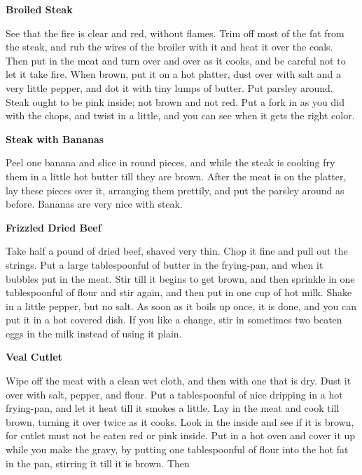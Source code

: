 \documentclass[11pt]{book}
\newcommand{\indpar}{\par\noindent\hspace*{\parindent}}
\newcommand{\instruction}{\indpar}
\newenvironment{RecipeTitle}{\medskip\begin{center}\large\bf }{\end{center}\smallskip}
\begin{document}
\begin{RecipeTitle}
Broiled Steak\label{broiled_steak}
\end{RecipeTitle}
\instruction
  See that the fire is clear and red, without flames.  Trim off
most of the fat from the steak, and rub the wires of the broiler
with it and heat it over the coals.  Then put in the meat and
turn over and over as it cooks, and be careful not to let it take
fire.  When brown, put it on a hot platter, dust over with salt
and a very little pepper, and dot it with tiny lumps of butter.
Put parsley around.  Steak ought to be pink inside; not brown
and not red.  Put a fork in as you did with the chops, and twist
in a little, and you can see when it gets the right color.
\begin{RecipeTitle}
Steak with Bananas\label{steak_with_bananas}
\end{RecipeTitle}
\instruction
  Peel one banana and slice in round pieces, and while the steak
is cooking fry them in a little hot butter till they are brown.
After the meat is on the platter, lay these pieces over it,
arranging them prettily, and put the parsley around as before.
Bananas are very nice with steak.\pagebreak[4]
\begin{RecipeTitle}
Frizzled Dried Beef\label{frizzled_dried_beef}
\end{RecipeTitle}
\instruction
  Take half a pound of dried beef, shaved very thin.  Chop it fine
and pull out the strings.  Put a large tablespoonful of butter in
the frying-pan, and when it bubbles put in the meat.  Stir till it
begins to get brown, and then sprinkle in one tablespoonful of flour
and stir again, and then put in one cup of hot milk.  Shake in a
little pepper, but no salt.  As soon as it boils up once, it is
done, and you can put it in a hot covered dish.  If you like a
change, stir in sometimes two beaten eggs in the milk instead of
using it plain.
\begin{RecipeTitle}
Veal Cutlet\label{veal_cutlet}
\end{RecipeTitle}
\instruction
  Wipe off the meat with a clean wet cloth, and then with one that
is dry.  Dust it over with salt, pepper, and flour.  Put a tablespoonful
of nice dripping in a hot frying-pan, and let it heat till it smokes
a little.  Lay in the meat and cook till brown, turning it over twice
as it cooks.  Look in the inside and see if it is brown, for cutlet
must not be eaten red or pink inside.  Put in a hot oven and cover it
up while you make the gravy, by putting one tablespoonful of flour
into the hot fat in the pan, stirring it till it is brown.  Then
\end{document}
